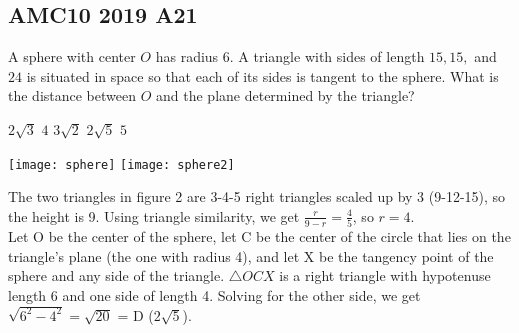 \documentclass[12pt]{exam}
\begin{document}
\thispagestyle{empty}

\begin{center}\section*{AMC10 2019 A21}

\end{center}
\bigskip
\begin{questions}

\question 
A sphere with center $O$ has radius $6$. 
A triangle with sides of length $15, 15,$ and $24$ 
is situated in space so that each of its sides is tangent to the sphere. 
What is the distance between $O$ and the plane determined by the triangle? 
\bigskip

\begin{oneparchoices}
    \choice $2\sqrt{3}$
    \choice $4$
    \choice $3\sqrt{2}$
    \choice $2\sqrt{5}$
    \choice $5$
\end{oneparchoices}

\vspace{1cm}
\texttt{[image: sphere]}
\hspace{2cm}
\texttt{[image: sphere2]}
\vspace{1cm}

The two triangles in figure 2 are 3-4-5 right triangles 
scaled up by 3 (9-12-15), so the height is 9. 
Using triangle similarity, we get $\frac{r}{9 - r} = \frac{4}{5}$, 
so $r = 4$.
\\[0.5cm]
Let O be the center of the sphere, let C be the center of the 
circle that lies on the triangle's plane (the one with radius 4), 
and let X be the tangency point of the sphere and any side of the 
triangle. $\triangle OCX$ is a right triangle with hypotenuse length 6
and one side of length 4. Solving for the other side, we get 
$\sqrt{6^2 - 4^2} = \sqrt{20}$ = D ($2\sqrt{5}$).
\end{questions}
\end{document}
